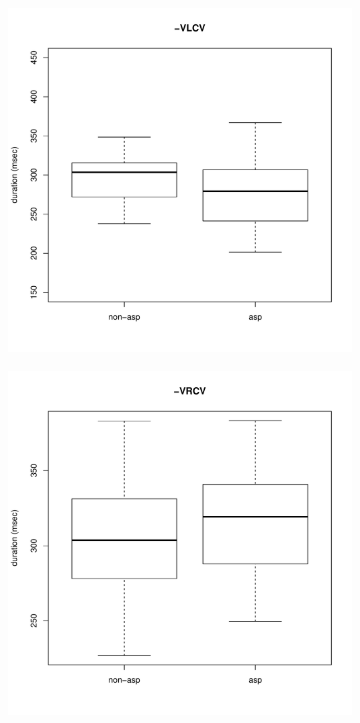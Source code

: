 \documentclass[11pt,a4paper,oneside,openany]{memoir}\usepackage[]{graphicx}\usepackage[]{color}
\newenvironment{knitrout}{}{} %
\begin{document}
\begin{figure}
\begin{subfigure}{.5\textwidth}
\begin{knitrout}
\end{knitrout}
\end{subfigure}
\begin{subfigure}{.5\textwidth}
\centering
\begin{knitrout}
\color{fgcolor}
\includegraphics[width=\textwidth]{img/di-lat-vor-1} 

\end{knitrout}
\end{subfigure}
\begin{subfigure}{.5\textwidth}
\centering
\begin{knitrout}
\color{fgcolor}
\includegraphics[width=\textwidth]{img/di-rho-vor-1} 


\end{knitrout}
\end{subfigure}
\end{figure}
\end{document}
